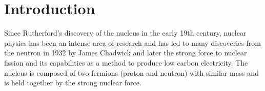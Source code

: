\section{Introduction}
Since Rutherford’s discovery of the nucleus in the early 19th century,\cite{noauthor_discovery_nodate} nuclear physics has been an intense area of research and has led to many discoveries from the neutron in 1932 by James Chadwick \cite{noauthor_discovery_nodate-1} and later the strong force to nuclear fission and its capabilities as a method to produce low carbon electricity.
The nucleus is composed of two fermions (proton and neutron) with similar mass and is held together by the strong nuclear force.